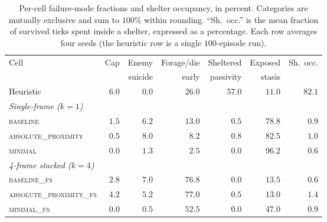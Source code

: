 \documentclass[12pt,a4paper,titlepage]{article}
\begin{document}
\begin{table}[!ht]
\centering
\caption{Per-cell failure-mode fractions and shelter occupancy, in percent. Categories are mutually exclusive and sum to $100\%$ within rounding. ``Sh.\ occ.'' is the mean fraction of survived ticks spent inside a shelter, expressed as a percentage. Each row averages four seeds (the heuristic row is a single $100$-episode run).}
\label{tab:failure_modes}
\footnotesize
\setlength{\tabcolsep}{4pt}
\begin{tabular}{lrrrrrr}
\toprule
Cell & Cap & Enemy & Forage/die & Sheltered & Exposed & Sh.\ occ. \\
     &     & suicide & early       & passivity & stasis  &   \\
\midrule
Heuristic                          & $6.0$ & $0.0$ & $26.0$ & $\mathbf{57.0}$ & $11.0$ & $82.1$ \\
\midrule
\multicolumn{7}{l}{\textit{Single-frame ($k=1$)}} \\
\textsc{baseline}                  & $1.5$ & $6.2$ & $13.0$ & $0.5$ & $\mathbf{78.8}$ & $0.9$ \\
\textsc{absolute\_proximity}       & $0.5$ & $8.0$ & $8.2$ & $0.8$ & $\mathbf{82.5}$ & $1.0$ \\
\textsc{minimal}                   & $0.0$ & $1.3$ & $2.5$ & $0.0$ & $\mathbf{96.2}$ & $0.6$ \\
\midrule
\multicolumn{7}{l}{\textit{4-frame stacked ($k=4$)}} \\
\textsc{baseline\_fs}              & $2.8$ & $7.0$ & $\mathbf{76.8}$ & $0.0$ & $13.5$ & $0.6$ \\
\textsc{absolute\_proximity\_fs}   & $4.2$ & $5.2$ & $\mathbf{77.0}$ & $0.5$ & $13.0$ & $1.4$ \\
\textsc{minimal\_fs}               & $0.0$ & $0.5$ & $\mathbf{52.5}$ & $0.0$ & $47.0$ & $0.9$ \\
\bottomrule
\end{tabular}
\end{table}

\newpage


\end{document}
